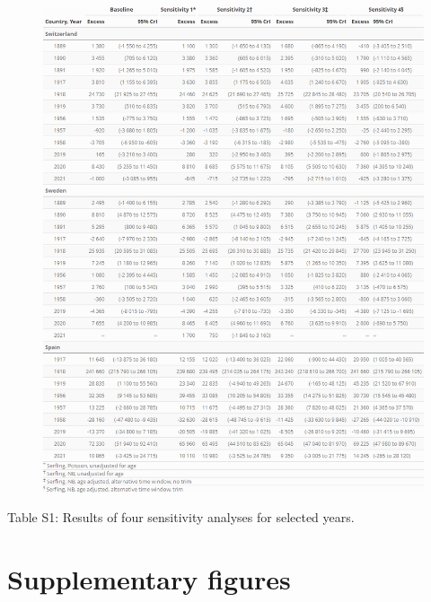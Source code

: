 \documentclass{article}
\begin{document}
	\begin{figure}[H]
		\centering	
		\includegraphics[width=\linewidth]{../Table_S1.png}
	\end{figure}
	
	Table S1: Results of four sensitivity analyses for selected years.  
	
	\section{Supplementary figures}
	
\end{document}

